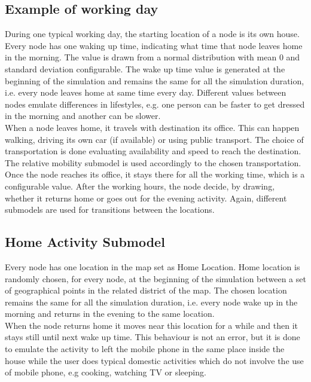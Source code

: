 \subsection{Example of working day}
During one typical working day, the starting location of a node is its own house. Every node has one waking up time, indicating what time that node leaves home in the morning. The value is drawn from a normal distribution with mean 0 and standard deviation configurable. The wake up time value is generated at the beginning of the simulation and remains the same for all the simulation duration, i.e. every node leaves home at same time every day. Different values between nodes emulate differences in lifestyles, e.g. one person can be faster to get dressed in the morning and another can be slower.
\\ 

When a node leaves home, it travels with destination its office. This can happen walking, driving its own car (if available) or using public transport. The choice of transportation is done evaluating availability and speed to reach the destination. The relative mobility submodel is used accordingly to the chosen transportation.
\\

Once the node reaches its office, it stays there for all the working time, which is a configurable value. After the working hours, the node decide, by drawing, whether it returns home or goes out for the evening activity. Again, different submodels are used for transitions between the locations.


\subsection{Home Activity Submodel}
Every node has one location in the map set as Home Location. Home location is randomly chosen, for every node, at the beginning of the simulation between a set of geographical points in the related district of the map. The chosen location remains the same for all the simulation duration, i.e. every node wake up in the morning and returns in the evening to the same location.
\\

When the node returns home it moves near this location for a while and then it stays still until next wake up time. This behaviour is not an error, but it is done to emulate the activity to left the mobile phone in the same place inside the house while the user does typical domestic activities which do not involve the use of mobile phone, e.g cooking, watching TV or sleeping.

